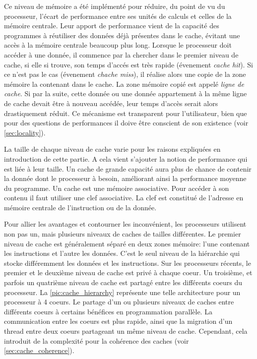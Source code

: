 Ce niveau de mémoire a été implémenté pour réduire, du point de vu du processeur, l'écart de performance entre ses unités de calculs et celles de la mémoire centrale. Leur apport de performance vient de la capacité des programmes à réutiliser des données déjà présentes dans le cache, évitant une accès à la mémoire centrale beaucoup plus long. Lorsque le processeur doit accéder à une donnée, il commence par la chercher dans le premier niveau de cache, si elle si trouve, son temps d'accés est très rapide (évenement \textit{cache hit}). Si ce n'est pas le cas (évenement \textit{chache miss}), il réalise alors une copie de la zone mémoire la contenant dans le cache. La zone mémoire copié est appelé \textit{ligne de cache}. Si par la suite, cette donnée ou une donnée appartement à la même ligne de cache devait être à nouveau accédée, leur temps d'accès serait alors drastiquement réduit. Ce mécanisme est transparent pour l'utilisateur, bien que pour des questions de performances il doive être conscient de son existence (voir \autoref{sec:locality}). 

La taille de chaque niveau de cache varie pour les raisons expliquées en introduction de cette partie. A cela vient s'ajouter la notion de performance qui est liée à leur taille. Un cache de grande capacité aura plus de chance de contenir la donnée dont le processeur à besoin, améliorant ainsi la performance moyenne du programme. Un cache est une mémoire associative. Pour accéder à son contenu il faut utiliser une clef associative. La clef est constitué de l'adresse en mémoire centrale de l'instruction ou de la donnée.

Pour allier les avantages et contourner les inconvénient, les processeurs utilisent non pas un, mais plusieurs niveaux de caches de tailles différentes.
Le premier niveau de cache est généralement séparé en deux zones mémoire: l'une contenant les instructions et l'autre les données. C'est le seul niveau de la hiérarchie qui stocke différemment les données et les instructions. Sur les processeurs récents, le premier et le deuxième niveau de cache est privé à chaque coeur. Un troisième, et parfois un quatrième niveau de cache est partagé entre les différents coeurs du processeur. La \autoref{pic:cache_hierarchy} représente une telle architecture pour un processeur à 4 coeurs. Le partage d'un ou plusieurs niveaux de caches entre différents coeurs à certains bénéfices en programmation parallèle. La communication entre les coeurs est plus rapide, ainsi que la migration d'un thread entre deux coeurs partageant un même niveau de cache. Cependant, cela introduit de la complexité pour la cohérence des caches (voir \autoref{sec:cache_coherence}).

